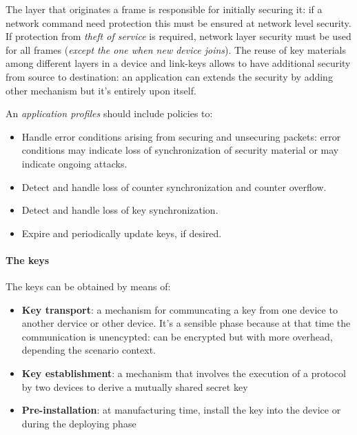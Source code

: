 \documentclass[10pt,a4paper]{report}
\theoremstyle{definition}
\begin{document}
The layer that originates a frame is responsible for initially securing it: if a network command need protection this must be ensured at network level security. If protection from \textit{theft of service} is required, network layer security must be used for all frames (\textit{except the one when new device joins}). The reuse of key materials among different layers in a device and link-keys allows to have additional security from source to destination: an application can extends the security by adding other mechanism but it's entirely upon itself.

An \textit{application profiles} should include policies to:
\begin{itemize}
	\item 
	Handle error conditions arising from securing and unsecuring packets: error conditions may indicate loss of synchronization of security material or may indicate ongoing attacks.
	\item 
	Detect and handle loss of counter synchronization and counter overflow.
	\item 
	Detect and handle loss of key synchronization.
	\item 
	Expire and periodically update keys, if desired.
\end{itemize}
\paragraph{The keys}\label{sec:the-keys}
The keys can be obtained by means of:
\begin{itemize}
	\item 
	\textbf{Key transport}: a mechanism for communcating a key from one device to another dervice or other device. It's a sensible phase because at that time the communication is unencypted: can be encrypted but with more overhead, depending the scenario context.
	\item 
	\textbf{Key establishment}:  a mechanism that involves the execution of a protocol by two devices to derive a mutually shared secret key
	\item 
	\textbf{Pre-installation}: at manufacturing time, install the key into the device or during the deploying phase
\end{itemize}
\end{document}
